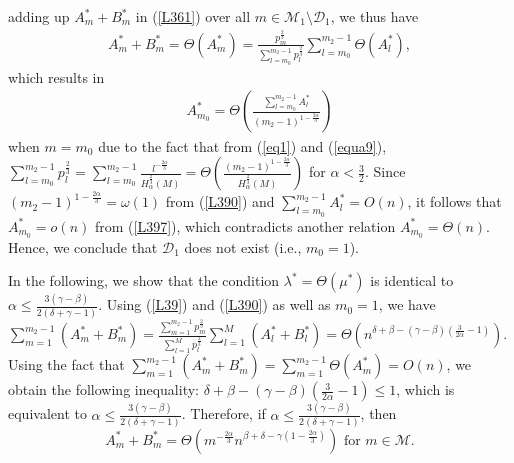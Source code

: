 \documentclass[10pt,journal,compsoc,onecolumn]{IEEEtran}
\begin{document}
adding up $A_m^*+B_m^*$ in (\ref{L361}) over all $m \in
\mathcal{M}_1\setminus\mathcal{D}_1$, we thus have
\begin{align}
A_{m}^*+B_{m}^*=\Theta\left(A_{m}^*\right)=\frac{
p^{\frac{2}{3}}_{m}}{\sum_{l=m_0}^{m_2-1}p^{\frac{2}{3}}_l}\sum_{l=m_0}^{m_2-1}\Theta\left(A_l^*\right),\nonumber
\end{align}
which results in
\begin{align}
\label{L397} A_{m_0}^*
=\Theta\left(\frac{\sum_{l=m_0}^{m_2-1}A_l^*}{(m_2-1)^{1-\frac{2\alpha}{3}}}\right)
\end{align}
when $m=m_0$ due to the fact that from (\ref{eq1}) and
(\ref{equa9}), $\sum_{l=m_0}^{m_2-1}
p^{\frac{2}{3}}_l=\sum_{l=m_0}^{m_2-1}
\frac{l^{-\frac{2\alpha}{3}}}{H^{\frac{2}{3}}_{\alpha}(M)}=\Theta\left(\frac{(m_2-1)^{1-\frac{2\alpha}{3}}}{H^{\frac{2}{3}}_{\alpha}(M)}\right)$
for $\alpha<\frac{3}{2}$. Since
$(m_2-1)^{1-\frac{2\alpha}{3}}=\omega(1)$ from (\ref{L390}) and
$\sum_{l=m_0}^{m_2-1}A_l^*=O(n)$, it follows that $A_{m_0}^*=o(n)$
from (\ref{L397}), which contradicts another relation
$A_{m_0}^*=\Theta(n)$. Hence, we conclude that $\mathcal{D}_1$
does not exist (i.e., $m_0=1$).\par In the following, we show that
the condition $\lambda^*=\Theta\left(\mu^*\right)$ is identical to
$\alpha \leq \frac{3(\gamma-\beta)}{2(\delta+\gamma-1)}$. Using
(\ref{L39}) and (\ref{L390}) as well as $m_0=1$, we have
$\sum_{m=1}^{m_2-1}(A_m^* + B_m^*) =\frac{
\sum_{m=1}^{m_2-1}p^{\frac{2}{3}}_m}{\sum_{l=1}^{M}p^{\frac{2}{3}}_l}\sum_{l=1}^{M}(A_l^*
+
B_l^*)=\Theta\left(n^{\delta+\beta-(\gamma-\beta)\left(\frac{3}{2\alpha}-1\right)}\right)$.
Using the fact that $\sum_{m=1}^{m_2-1}(A_m^* +
B_m^*)=\sum_{m=1}^{m_2-1}\Theta\left(A_m^*\right)=O(n)$, we obtain
the following inequality:
$\delta+\beta-(\gamma-\beta)\left(\frac{3}{2\alpha}-1\right)\leq
1$, which is equivalent to
$\alpha \leq \frac{3(\gamma-\beta)}{2(\delta+\gamma-1)}$.
Therefore, if $\alpha \leq
\frac{3(\gamma-\beta)}{2(\delta+\gamma-1)}$, then
\begin{equation}
\label{equa12}
A^{*}_m+B^{*}_m=
 \Theta\left(m^{-\frac{2\alpha}{3}}n^{\beta+\delta-\gamma\left(1-\frac{2\alpha}{3}\right)}\right) \text{ for }  m \in \mathcal{M}.\nonumber
\end{equation}
\end{document}

